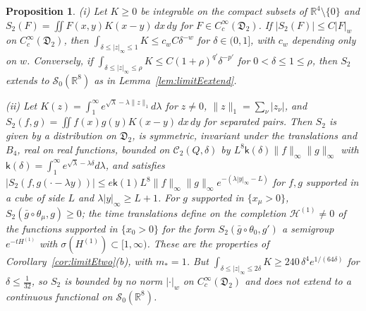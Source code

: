 \documentclass[aps,prd,twocolumn,superscriptaddress,nofootinbib,longbibliography,floatfix,amsmath,amssymb,10pt]{revtex4-2}
\newtheorem{proposition}[theorem]{Proposition}
\theoremstyle{definition}
\theoremstyle{remark}
\newcommand{\R}{\mathbb{R}}
\begin{document}
\begin{proposition}\label{prop:limitEnotempered}
\textup{(i)} Let $K\ge0$ be integrable on the compact subsets of
$\R^4\setminus\{0\}$ and $S_2(F)=\iint F(x,y)K(x-y)\,dx\,dy$ for $F\in
C^\infty_c(\mathfrak D_2)$. If $|S_2(F)|\le C|F|_w$ on $C^\infty_c(\mathfrak
D_2)$, then $\int_{\delta\le|z|_\infty\le1}K\le c_wC\delta^{-w}$ for
$\delta\in(0,1]$, with $c_w$ depending only on $w$. Conversely, if
$\int_{\delta\le|z|_\infty\le\rho}K\le C(1+\rho)^{q'}\delta^{-p'}$ for
$0<\delta\le1\le\rho$, then $S_2$ extends to $\mathcal S_0(\R^8)$ as in
Lemma~\textup{\ref{lem:limitEextend}}.

\textup{(ii)} Let $K(z)=\int_1^\infty e^{\sqrt\lambda-\lambda\|z\|_1}d\lambda$
for $z\ne0$, $\|z\|_1=\sum_\nu|z_\nu|$, and $S_2(f,g)=\iint f(x)g(y)K(x-y)\,dx
\,dy$ for separated pairs. Then $S_2$ is given by a distribution on
$\mathfrak D_2$, is symmetric, invariant under the translations and $B_4$,
real on real functions, bounded on $\mathcal C_2(Q,\delta)$ by $L^8\mathsf
k(\delta)\|f\|_\infty\|g\|_\infty$ with $\mathsf k(\delta)=\int_1^\infty
e^{\sqrt\lambda-\lambda\delta}d\lambda$, and satisfies $|S_2(f,g(\cdot-\lambda
y))|\le e\mathsf k(1)L^8\|f\|_\infty\|g\|_\infty e^{-(\lambda|y|_\infty-L)}$ for
$f,g$ supported in a cube of side $L$ and $\lambda|y|_\infty\ge L+1$. For $g$
supported in $\{x_\mu>0\}$, $S_2(\bar g\circ\theta_\mu,g)\ge0$; the time
translations define on the completion $\mathcal H^{(1)}\ne0$ of the functions
supported in $\{x_0>0\}$ for the form $S_2(\bar g\circ\theta_0,g')$ a semigroup
$e^{-tH^{(1)}}$ with $\sigma(H^{(1)})\subset[1,\infty)$. These are the
properties of Corollary~\textup{\ref{cor:limitEtwo}(b)}, with $m_*=1$. But
$\int_{\delta\le|z|_\infty\le2\delta}K\ge240\,\delta^4e^{1/(64\delta)}$ for
$\delta\le\frac1{32}$, so $S_2$ is bounded by no norm $|\cdot|_w$ on
$C^\infty_c(\mathfrak D_2)$ and does not extend to a continuous functional on
$\mathcal S_0(\R^8)$.
\end{proposition}
\end{document}
